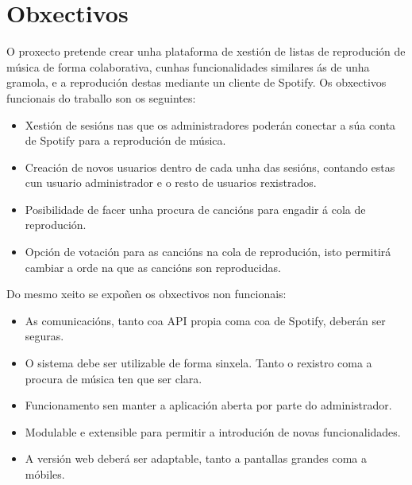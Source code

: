 \section{Obxectivos}
O proxecto pretende crear unha plataforma de xestión de listas de reprodución de música de forma colaborativa, cunhas funcionalidades similares ás de unha gramola, e a reprodución destas mediante un cliente de Spotify. Os obxectivos funcionais do traballo son os seguintes:
\begin{itemize}
	\item Xestión de sesións nas que os administradores poderán conectar a súa conta de Spotify para a reprodución de música.
	\item Creación de novos usuarios dentro de cada unha das sesións, contando estas cun usuario administrador e o resto de usuarios rexistrados.
	\item Posibilidade de facer unha procura de cancións para engadir á cola de reprodución.
	\item Opción de votación para as cancións na cola de reprodución, isto permitirá cambiar a orde na que as cancións son reproducidas.
\end{itemize}
Do mesmo xeito se expoñen os obxectivos non funcionais:
\begin{itemize}
	\item As comunicacións, tanto coa API propia coma coa de Spotify, deberán ser seguras.
	\item O sistema debe ser utilizable de forma sinxela. Tanto o rexistro coma a procura de música ten que ser clara.
	\item Funcionamento sen manter a aplicación aberta por parte do administrador.
	\item Modulable e extensible para permitir a introdución de novas funcionalidades.
	\item A versión web deberá ser adaptable, tanto a pantallas grandes coma a móbiles.
\end{itemize}

